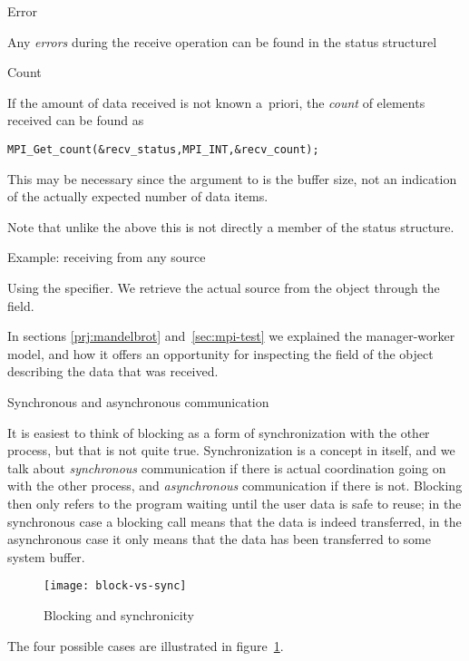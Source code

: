 
 {Error}

Any \emph{errors}
during the receive operation can be found in the status
structurel


 {Count}

If the amount of data received is not known a~priori, the
\emph{count} of elements received
can be found as
\begin{lstlisting}
MPI_Get_count(&recv_status,MPI_INT,&recv_count);
\end{lstlisting}
This may be necessary since the  argument to  is 
the buffer size, not an indication of the actually expected number of
data items.

Note that unlike the above this is not directly a member of the status
structure.


 {Example: receiving from any source}

Using the  specifier. We retrieve the
actual source from the  object through the
 field.
%
%

In sections \ref{prj:mandelbrot} and~\ref{sec:mpi-test} we explained
the manager-worker model, and how it offers an opportunity for inspecting the
 field of the 
object describing the data that was received.

 {Synchronous and asynchronous communication}


It is easiest to think of blocking as a form of synchronization with
the other process, but that is not quite true. Synchronization is a
concept in itself, and we talk about \emph{synchronous} communication
if there is actual coordination going on with the other process,
and \emph{asynchronous} communication if there is not. Blocking then
only refers to the program waiting until the user data is safe
to reuse; in the synchronous case a blocking call means that the data
is indeed transferred, in the asynchronous case it only means that the
data has been transferred to some system buffer.
%
\begin{figure}[ht]
\texttt{[image: block-vs-sync]}
\caption{Blocking and synchronicity}
\label{fig:block-sync}
\end{figure}
The four possible cases are illustrated in figure~\ref{fig:block-sync}.

